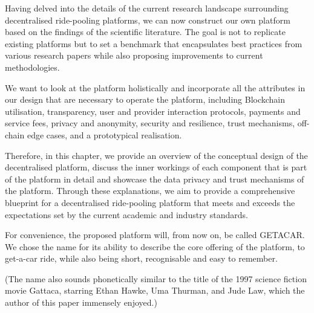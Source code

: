 Having delved into the details of the current research landscape surrounding decentralised ride-pooling platforms, we can now construct our own platform based on the findings of the scientific literature. The goal is not to replicate existing platforms but to set a benchmark that encapsulates best practices from various research papers while also proposing improvements to current methodologies.

We want to look at the platform holistically and incorporate all the attributes in our design that are necessary to operate the platform, including Blockchain utilisation, transparency, user and provider interaction protocols, payments and service fees, privacy and anonymity, security and resilience, trust mechanisms, off-chain edge cases, and a prototypical realisation.

Therefore, in this chapter, we provide an overview of the conceptual design of the decentralised platform, discuss the inner workings of each component that is part of the platform in detail and showcase the data privacy and trust mechanisms of the platform.
Through these explanations, we aim to provide a comprehensive blueprint for a decentralised ride-pooling platform that meets and exceeds the expectations set by the current academic and industry standards.

For convenience, the proposed platform will, from now on, be called GETACAR. We chose the name for its ability to describe the core offering of the platform, to get-a-car ride, while also being short, recognisable and easy to remember.

(The name also sounds phonetically similar to the title of the 1997 science fiction movie Gattaca, starring Ethan Hawke, Uma Thurman, and Jude Law, which the author of this paper immensely enjoyed.)
